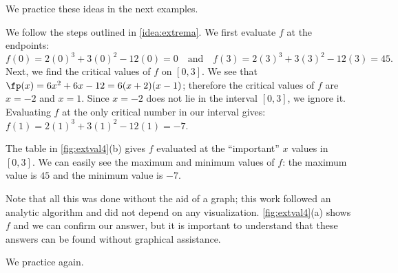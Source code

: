 We practice these ideas in the next examples.

{We follow the steps outlined in \autoref{idea:extrema}. We first evaluate $f$ at the endpoints: $$f(0)=2(0)^3+3(0)^2-12(0) = 0 \quad \text{and}\quad f(3)=2(3)^3+3(3)^2-12(3) =45.$$
Next, we find the critical values of $f$ on $[0,3]$. We see that $\fp(x) = 6x^2+6x-12 = 6(x+2)(x-1)$; therefore the critical values of $f$ are $x=-2$ and $x=1$. Since $x=-2$ does not lie in the interval $[0,3]$, we ignore it. Evaluating $f$ at the only critical number in our interval gives: $f(1)=2(1)^3+3(1)^2-12(1) = -7$. 

The table in \autoref{fig:extval4}(b) gives $f$ evaluated at the ``important'' $x$ values in $[0,3]$. We can easily see the maximum and minimum values of $f$: the maximum value is $45$ and the minimum value is $-7$.}

Note that all this was done without the aid of a graph; this work followed an analytic algorithm and did not depend on any visualization. \autoref{fig:extval4}(a) shows $f$ and we can confirm our answer, but it is important to  understand that these answers can be found without graphical assistance.

We practice again.


